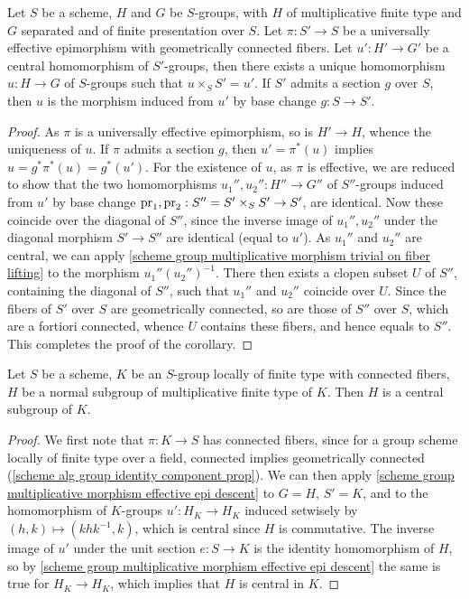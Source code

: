 \begin{corollary}\label{scheme group multiplicative morphism effective epi descent}
Let $S$ be a scheme, $H$ and $G$ be $S$-groups, with $H$ of multiplicative finite type and $G$ separated and of finite presentation over $S$. Let $\pi:S'\to S$ be a universally effective epimorphism with geometrically connected fibers. Let $u':H'\to G'$ be a central homomorphism of $S'$-groups, then there exists a unique homomorphism $u:H\to G$ of $S$-groups such that $u\times_SS'=u'$. If $S'$ admits a section $g$ over $S$, then $u$ is the morphism induced from $u'$ by base change $g:S\to S'$.
\end{corollary}
\begin{proof}
As $\pi$ is a universally effective epimorphism, so is $H'\to H$, whence the uniqueness of $u$. If $\pi$ admits a section $g$, then $u'=\pi^*(u)$ implies $u=g^*\pi^*(u)=g^*(u')$. For the existence of $u$, as $\pi$ is effective, we are reduced to show that the two homomorphisms $u_1'',u_2'':H''\to G''$ of $S''$-groups induced from $u'$ by base change $\mathrm{pr}_1,\mathrm{pr}_2:S''=S'\times_SS'\to S'$, are identical. Now these coincide over the diagonal of $S''$, since the inverse image of $u_1'',u_2''$ under the diagonal morphism $S'\to S''$ are identical (equal to $u'$). As $u_1''$ and $u_2''$ are central, we can apply \cref{scheme group multiplicative morphism trivial on fiber lifting} to the morphism $u_1''(u_2'')^{-1}$. There then exists a clopen subset $U$ of $S''$, containing the diagonal of $S''$, such that $u_1''$ and $u_2''$ coincide over $U$. Since the fibers of $S'$ over $S$ are geometrically connected, so are those of $S''$ over $S$, which are a fortiori connected, whence $U$ contains these fibers, and hence equals to $S''$. This completes the proof of the corollary.
\end{proof}

\begin{corollary}\label{scheme group multiplicative normal subgroup is central}
Let $S$ be a scheme, $K$ be an $S$-group locally of finite type with connected fibers, $H$ be a normal subgroup of multiplicative finite type of $K$. Then $H$ is a central subgroup of $K$.
\end{corollary}
\begin{proof}
We first note that $\pi:K\to S$ has connected fibers, since for a group scheme locally of finite type over a field, connected implies geometrically connected (\cref{scheme alg group identity component prop}). We can then apply \cref{scheme group multiplicative morphism effective epi descent} to $G=H$, $S'=K$, and to the homomorphism of $K$-groups $u':H_K\to H_K$ induced setwisely by $(h,k)\mapsto(khk^{-1},k)$, which is central since $H$ is commutative. The inverse image of $u'$ under the unit section $e:S\to K$ is the identity homomorphism of $H$, so by \cref{scheme group multiplicative morphism effective epi descent} the same is true for $H_K\to H_K$, which implies that $H$ is central in $K$.
\end{proof}

